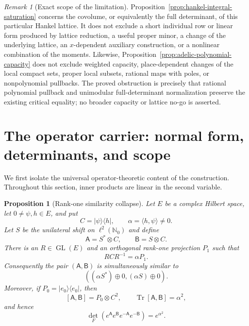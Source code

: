 \documentclass[11pt]{article}
\newtheorem{proposition}[theorem]{Proposition}
\theoremstyle{definition}
\theoremstyle{remark}
\newtheorem{remark}[theorem]{Remark}
\begin{document}
\begin{remark}[Exact scope of the limitation]
Proposition~\ref{prop:hankel-integral-saturation} concerns the covolume, or
equivalently the full determinant, of this particular Hankel lattice.
It does not exclude a short individual row or linear form produced by
lattice reduction, a useful proper minor, a change of the underlying
lattice, an \(x\)-dependent auxiliary construction, or a nonlinear
combination of the moments.  Likewise,
Proposition~\ref{prop:adelic-polynomial-capacity} does not exclude weighted
capacity, place-dependent changes of the local compact sets, proper local
subsets, rational maps with poles, or nonpolynomial pullbacks.  The proved
obstruction is precisely that rational polynomial pullback and unimodular
full-determinant normalization preserve the existing critical equality;
no broader capacity or lattice no-go is asserted.
\end{remark}


\section{The operator carrier: normal form, determinants, and scope}

We first isolate the universal operator-theoretic content of the construction.
Throughout this section, inner products are linear in the second variable.

\begin{proposition}[Rank-one similarity collapse]\label{prop:rank-one-collapse}
Let $E$ be a complex Hilbert space, let $0\ne\psi,h\in E$, and put
\[
 C=|\psi\rangle\langle h|,
 \qquad \alpha=\langle h,\psi\rangle\ne0.
\]
Let $S$ be the unilateral shift on $\ell^2(\mathbb N_0)$ and define
\[
 \mathsf A=S^*\otimes C,
 \qquad
 \mathsf B=S\otimes C.
\]
There is an $R\in\operatorname{GL}(E)$ and an orthogonal rank-one
projection $P_1$ such that
\[
 RCR^{-1}=\alpha P_1.
\]
Consequently the pair $(\mathsf A,\mathsf B)$ is simultaneously similar to
\[
 ((\alpha S^*)\oplus0,(\alpha S)\oplus0).
\]
Moreover, if $P_0=|e_0\rangle\langle e_0|$, then
\[
 [\mathsf A,\mathsf B]=P_0\otimes C^2,
 \qquad
 \operatorname{Tr}[\mathsf A,\mathsf B]=\alpha^2,
\]
and hence
\begin{equation}\label{eq:universal-hhp}
 \det_F\!\left(
 e^{\mathsf A}e^{\mathsf B}e^{-\mathsf A}e^{-\mathsf B}
 \right)=e^{\alpha^2}.
\end{equation}
\end{proposition}
\end{document}
